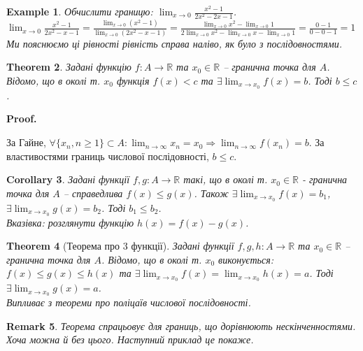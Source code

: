 \documentclass[a4paper, 14pt]{article}
\makeatletter
\def\qed{$\blacksquare$}
\theoremstyle{theoremdd}
\newtheorem{theorem}{Theorem}[subsection]
\theoremstyle{theoremdd}
\theoremstyle{theoremdd}
\theoremstyle{theoremdd}
\newtheorem{example}[theorem]{Example}
\theoremstyle{theoremdd}
\theoremstyle{theoremdd}
\newtheorem{remark}[theorem]{Remark}
\theoremstyle{theoremdd}
\theoremstyle{theoremdd}
\newtheorem{corollary}[theorem]{Corollary}
\renewenvironment{proof}[1][Proof.\\]{\par
\pushQED{\hfill \qed}%
\normalfont \topsep6\p@\@plus6\p@\relax
\trivlist
\item\relax
{\bfseries
#1\@addpunct{.}}\hspace\labelsep\ignorespaces
}{%
\popQED\endtrivlist\@endpefalse
}
\makeatother
\begin{document}
	\begin{example}
	Обчислити границю: $\displaystyle \lim_{x \to 0} \frac{x^2-1}{2x^2-2x-1}$.\\
	$\displaystyle \lim_{x \to 0} \frac{x^2-1}{2x^2-x-1} = \frac{\displaystyle \lim_{x \to 0} (x^2-1)}{\displaystyle \lim_{x \to 0}(2x^2-x-1)} = \frac{\displaystyle \lim_{x \to 0}x^2 - \lim_{x \to 0}1}{\displaystyle 2\lim_{x \to 0}x^2 - \lim_{x \to 0}x - \lim_{x \to 0}1} = \frac{0-1}{0-0-1} = 1$\\
	Ми пояснюємо ці рівності рівність справа наліво, як було з послідовностями.
	\end{example}
	
	\begin{theorem}
	Задані функцію $f \colon A\to \mathbb{R}$ та $x_0 \in \mathbb{R}$ -- гранична точка для $A$. Відомо, що в околі т. $x_0$ функція $f(x) < c$ та $\exists \displaystyle \lim_{x \to x_0} f(x) = b$. Тоді $b \leq c$.
	\end{theorem}

	\begin{proof}
За Гайне, $\displaystyle \forall \{x_n, n \geq 1\} \subset A:  \lim_{n \to \infty} x_n = x_0 \Rightarrow \lim_{n \to \infty} f(x_n) = b$. За властивостями границь числової послідовності, $b \leq c$.
	\end{proof}
	
	\begin{corollary}
	Задані функції $f,g \colon A \to \mathbb{R}$ такі, що в околі т. $x_0 \in \mathbb{R}$ - гранична точка для $A$ -- справедлива $f(x) \leq g(x)$. Також $\exists \displaystyle \lim_{x \to x_0} f(x) = b_1$, $\exists \displaystyle \lim_{x \to x_0} g(x) = b_2$. Тоді $b_1 \leq b_2$.\\
\textit{Вказівка: розглянути функцію} $h(x) = f(x) - g(x)$.
	\end{corollary}
	
	\begin{theorem}[Теорема про 3 функції]
Задані функції $f,g,h \colon A \to \mathbb{R}$ та $x_0 \in \mathbb{R}$ -- гранична точка для $A$. Відомо, що в околі т. $x_0$ виконується: $f(x) \leq g(x) \leq h(x)$ та $\exists \displaystyle \lim_{x \to x_0} f(x) = \lim_{x \to x_0} h(x) = a$. Тоді $\exists \displaystyle \lim_{x \to x_0} g(x) = a$.\\
\textit{Випливає з теореми про поліцаїв числової послідовності.}
	\end{theorem}
	
	\begin{remark}
	Теорема спрацьовує для границь, що дорівнюють нескінченностями. Хоча можна й без цього. Наступний приклад це покаже.
	\end{remark}
	
\end{document}

